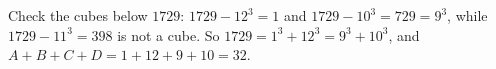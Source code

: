 Check the cubes below $1729$: $1729-12^3=1$ and $1729-10^3=729=9^3$, while $1729-11^3=398$ is not a cube. So $1729=1^3+12^3=9^3+10^3$, and $A+B+C+D=1+12+9+10=\boxed{32}$.
